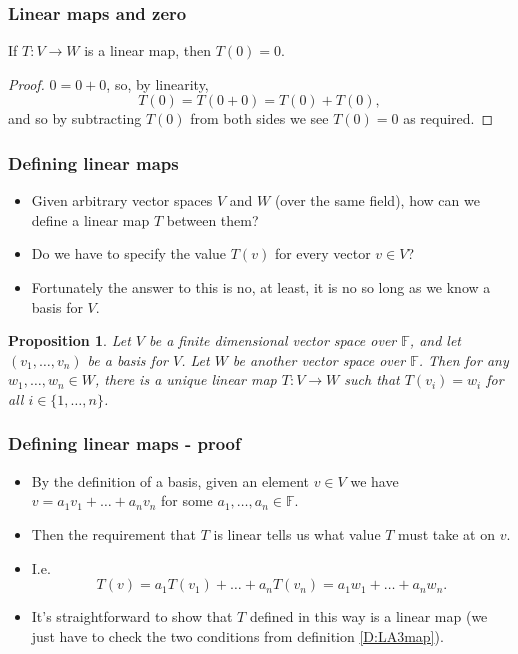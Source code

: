 \documentclass[handout]{beamer}
\newtheorem{proposition}[theorem]{Proposition}
\newcommand{\bF}{\mathbb{F}}
\begin{document}
\begin{frame}
\frametitle{Linear maps and zero}
\begin{lemma}
If $T:V\to W$ is a linear map, then $T(0) = 0$.
\end{lemma}
\begin{proof}
$0 = 0+0$, so, by linearity, 
\[T(0)=T(0+0) = T(0)+ T(0),\]
and so by subtracting $T(0)$ from both sides we see $T(0)=0$ as required.
\end{proof}
\end{frame}

\begin{frame}
\frametitle{Defining linear maps}
\begin{itemize}
\item Given arbitrary vector spaces $V$ and $W$ (over the same field), how can we define a linear map $T$ between them? 
\item Do we have to specify the value $T(v)$ for every vector $v\in V$? 
\item Fortunately the answer to this is no, at least, it is no so long as we know a basis for $V$.
\end{itemize}

\begin{proposition}\label{P:LA3mapdef}
Let $V$ be a finite dimensional vector space over $\bF$, and let $(v_1,\ldots,v_n)$ be a basis for $V$. Let $W$ be another vector space over $\bF$. Then for any $w_1,\ldots,w_n\in W$, there is a unique linear map $T:V\to W$ such that $T(v_i)=w_i$ for all $i\in\{1,\ldots,n\}$.
\end{proposition}
\end{frame}

\begin{frame}
\frametitle{Defining linear maps - proof}
\begin{itemize}
\item By the definition of a basis, given an element $v\in V$ we have $v = a_1v_1+\ldots +a_nv_n$ for some $a_1,\ldots,a_n\in\bF$. \vspace{0.4cm}
\item Then the requirement that $T$ is linear tells us what value $T$ must take at on $v$. \vspace{0.4cm}
\item I.e. 
\[T(v) = a_1T(v_1)+\ldots+a_nT(v_n) = a_1w_1+\ldots +a_n w_n. \]
\item It's straightforward to show that $T$ defined in this way is a linear map (we just have to check the two conditions from definition \ref{D:LA3map}).
\end{itemize}
\end{frame}
\end{document}
